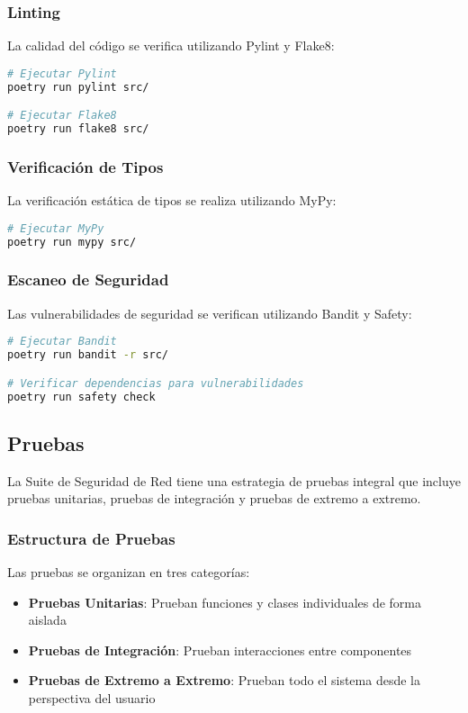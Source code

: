 \subsubsection{Linting}
La calidad del código se verifica utilizando Pylint y Flake8:

\begin{lstlisting}[language=bash, caption=Linting]
# Ejecutar Pylint
poetry run pylint src/

# Ejecutar Flake8
poetry run flake8 src/
\end{lstlisting}

\subsubsection{Verificación de Tipos}
La verificación estática de tipos se realiza utilizando MyPy:

\begin{lstlisting}[language=bash, caption=Verificación de Tipos]
# Ejecutar MyPy
poetry run mypy src/
\end{lstlisting}

\subsubsection{Escaneo de Seguridad}
Las vulnerabilidades de seguridad se verifican utilizando Bandit y Safety:

\begin{lstlisting}[language=bash, caption=Escaneo de Seguridad]
# Ejecutar Bandit
poetry run bandit -r src/

# Verificar dependencias para vulnerabilidades
poetry run safety check
\end{lstlisting}

\subsection{Pruebas}
La Suite de Seguridad de Red tiene una estrategia de pruebas integral que incluye pruebas unitarias, pruebas de integración y pruebas de extremo a extremo.

\subsubsection{Estructura de Pruebas}
Las pruebas se organizan en tres categorías:

\begin{itemize}
    \item \textbf{Pruebas Unitarias}: Prueban funciones y clases individuales de forma aislada
    \item \textbf{Pruebas de Integración}: Prueban interacciones entre componentes
    \item \textbf{Pruebas de Extremo a Extremo}: Prueban todo el sistema desde la perspectiva del usuario
\end{itemize}


